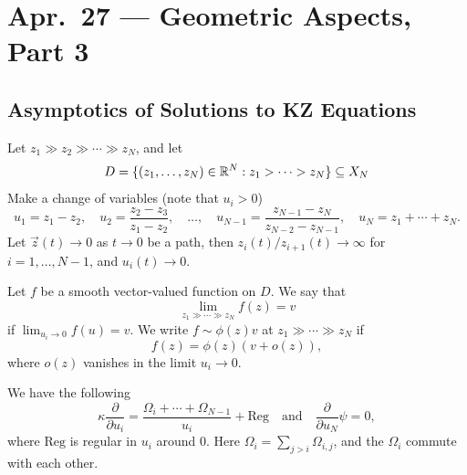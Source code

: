 \chapter{Apr.~27 --- Geometric Aspects, Part 3}

\section{Asymptotics of Solutions to KZ Equations}

\begin{remark}
  Let $z_1 \gg z_2 \gg \cdots \gg z_N$, and let
  \[
    D = \{
      (z_1, \dots, z_N) \in \mathbb{R}^N
      : z_1 > \cdots > z_N
    \} \subseteq X_N
  \]
  Make a change of variables (note that
  $u_i > 0$)
  \[
    u_1 = z_1 - z_2, \quad
    u_2 = \frac{z_2 - z_3}{z_1 - z_2}, \quad
    \dots, \quad
    u_{N-1} = \frac{z_{N-1} - z_N}{z_{N-2} - z_{N-1}}, \quad
    u_N = z_1 + \cdots + z_N.
  \]
  Let
  $\vec{z}(t) \to 0$ as $t \to 0$ be a path,
  then
  $z_i(t) / z_{i + 1}(t) \to \infty$
  for $i = 1, \dots, N - 1$,
  and $u_i(t) \to 0$.
\end{remark}

\begin{definition}
  Let $f$ be a smooth vector-valued function
  on $D$. We say that
  \[
    \lim_{z_1 \gg \cdots \gg z_N} f(z) = v
  \]
  if $\lim_{u_i \to 0} f(u) = v$. We write
  $f \sim \phi(z) v$ at
  $z_1 \gg \cdots \gg z_N$ if
  \[
    f(z) = \phi(z) (v + o(z)),
  \]
  where $o(z)$ vanishes in the limit
  $u_i \to 0$.
\end{definition}

\begin{lemma}
  We have the following
  \[
    \kappa \frac{\partial}{\partial u_i}
    = \frac{\Omega_i + \cdots + \Omega_{N - 1}}{u_i} + \mathrm{Reg}
    \quad \text{and} \quad
    \frac{\partial}{\partial u_N} \psi = 0,
  \]
  where $\mathrm{Reg}$ is regular in
  $u_i$ around $0$. Here
  $\Omega_i = \sum_{j > i} \Omega_{i, j}$, and
  the $\Omega_i$ commute with each other.
\end{lemma}

